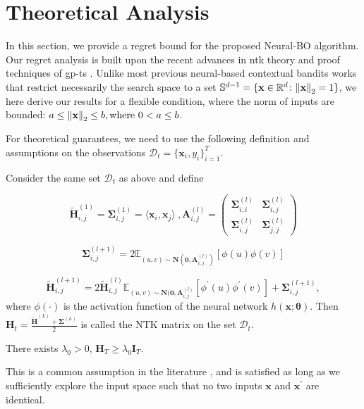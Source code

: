 \section{Theoretical Analysis}
\label{section:neural-bo_regret_analysis}

In this section, we provide a regret bound for the proposed Neural-BO algorithm. Our regret analysis is built upon the recent advances in \ac{ntk} theory \citep{allen2019convergence, cao2019generalization} and proof techniques of \ac{gp}-\ac{ts} \citep{chowdhury2017kernelized}. 
Unlike most previous neural-based contextual bandits works \citep{zhang2021neural, zhou2020neural} that restrict necessarily the search space to a set $\mathbb{S}^{d-1} = \{ \mathbf{x} \in \mathbb {R}^d \colon \norm{\mathbf{x}}_2 = 1 \}$, we here derive our results for a flexible condition, where the norm of inputs are bounded: $a \leq \norm{\mathbf{x}}_2 \leq b, \text{where } 0 < a \le b$. 

For theoretical guarantees, we need to use the following definition and assumptions on the observations $\mathcal{D}_t = \{\mathbf{x}_i, y_i\}^T_{i=1}$.


\begin{definition} 
\label{def:NTK_matrix}
Consider the same set $\mathcal{D}_t$ as above and define

\[ \widetilde{\mathbf{H}}_{i,j}^{(1)} = \mathbf{\Sigma}_{i,j}^{(1)} = \langle  \mathbf{x}_i, \mathbf{x}_j \rangle\ , \mathbf{A}_{i,j}^{(l)} = 
\begin{pmatrix}
\mathbf{\Sigma}_{i,i}^{(l)} & \mathbf{\Sigma}_{i,j}^{(l)} 
\\
\mathbf{\Sigma}_{i,j}^{(l)} & \mathbf{\Sigma}_{j,j}^{(l)}
\end{pmatrix}\] 

\[\mathbf{\Sigma}_{i,j}^{(l+1)} = 2 \mathbb{E}_{(u,v) \sim \mathbf{N}(\mathbf{0}, \mathbf{A}_{i,j}^{(l)})} [\phi(u) \phi(v)] \]

\[ \widetilde{\mathbf{H}}_{i,j}^{(l+1)} = 2\widetilde{\mathbf{H}}_{i,j}^{(l)}\mathbb{E}_{(u,v) \sim \mathbf{N}(\mathbf{0}, \mathbf{A}_{i,j}^{(l)}} [\phi^\prime(u) \phi^\prime(v)] + \mathbf{\Sigma}_{i,j}^{(l+1)}, \]
where $\phi(\cdot)$ is the activation function of the neural network $h(\mathbf{x}; \boldsymbol{\theta})$.
Then $\mathbf{H}_t = \frac{\mathbf{\widetilde{H}}^{(L)}+ \mathbf{\Sigma} ^ {(L)}}{2}$ is called the NTK matrix on the set $\mathcal{D}_t$. 
\end{definition}


\begin{assumption} \label{assumption:sufficient_exploration} There exists $\lambda_0 > 0$, 
$\mathbf{H}_T \ge \lambda_0 \mathbf{I}_T$.
\end{assumption}
This is a common assumption in the literature \citep{zhou2020neural,xu2020neural,zhang2021neural}, and is satisfied as long as we sufficiently explore the input space such that no two inputs $\mathbf{x}$ and $\mathbf{x}^\prime$ are identical.  

